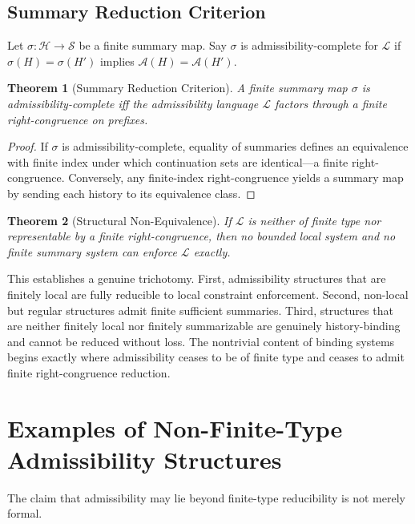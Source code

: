\documentclass[12pt, a4paper]{article}
\theoremstyle{plain}
\newtheorem{theorem}{Theorem}[section]
\theoremstyle{definition}
\theoremstyle{remark}
\begin{document}
\subsection{Summary Reduction Criterion}

Let $\sigma : \mathcal{H} \to \mathcal{S}$ be a finite summary map. Say $\sigma$ is admissibility-complete for $\mathcal{L}$ if $\sigma(H) = \sigma(H')$ implies $\mathcal{A}(H) = \mathcal{A}(H')$.

\begin{theorem}[Summary Reduction Criterion]
A finite summary map $\sigma$ is admissibility-complete iff the admissibility language $\mathcal{L}$ factors through a finite right-congruence on prefixes.
\end{theorem}

\begin{proof}
If $\sigma$ is admissibility-complete, equality of summaries defines an equivalence with finite index under which continuation sets are identical---a finite right-congruence. Conversely, any finite-index right-congruence yields a summary map by sending each history to its equivalence class.
\end{proof}

\begin{theorem}[Structural Non-Equivalence]
If $\mathcal{L}$ is neither of finite type nor representable by a finite right-congruence, then no bounded local system and no finite summary system can enforce $\mathcal{L}$ exactly.
\end{theorem}

This establishes a genuine trichotomy. First, admissibility structures that are finitely local are fully reducible to local constraint enforcement. Second, non-local but regular structures admit finite sufficient summaries. Third, structures that are neither finitely local nor finitely summarizable are genuinely history-binding and cannot be reduced without loss. The nontrivial content of binding systems begins exactly where admissibility ceases to be of finite type and ceases to admit finite right-congruence reduction.

\section{Examples of Non-Finite-Type Admissibility Structures}

The claim that admissibility may lie beyond finite-type reducibility is not merely formal.
\end{document}
